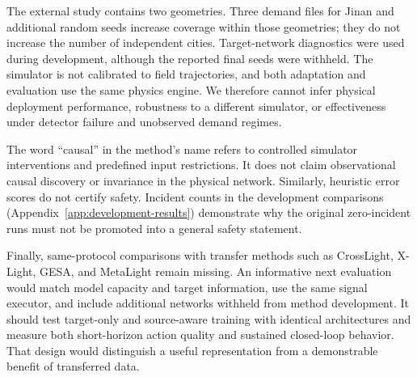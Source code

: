 The external study contains two geometries. Three demand files for Jinan and additional random seeds increase coverage within those geometries; they do not increase the number of independent cities. Target-network diagnostics were used during development, although the reported final seeds were withheld. The simulator is not calibrated to field trajectories, and both adaptation and evaluation use the same physics engine. We therefore cannot infer physical deployment performance, robustness to a different simulator, or effectiveness under detector failure and unobserved demand regimes.

The word ``causal'' in the method's name refers to controlled simulator interventions and predefined input restrictions. It does not claim observational causal discovery or invariance in the physical network. Similarly, heuristic error scores do not certify safety. Incident counts in the development comparisons (Appendix~\ref{app:development-results}) demonstrate why the original zero-incident runs must not be promoted into a general safety statement.

Finally, same-protocol comparisons with transfer methods such as CrossLight, X-Light, GESA, and MetaLight remain missing. An informative next evaluation would match model capacity and target information, use the same signal executor, and include additional networks withheld from method development. It should test target-only and source-aware training with identical architectures and measure both short-horizon action quality and sustained closed-loop behavior. That design would distinguish a useful representation from a demonstrable benefit of transferred data.
